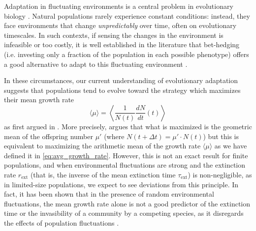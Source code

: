 \documentclass[aps,pre,reprint,10pt,superscriptaddress]{revtex4-2}
\begin{document}
Adaptation in fluctuating environments is a central problem in evolutionary biology \cite{gillespieNaturalSelectionVariances1977,kingscollegeRiskUncertaintyEvolutionary1982,kussellPhenotypicDiversityPopulation2005,ashcroftFixationFinitePopulations2014,patraEmergencePhenotypeSwitching2015,huftonIntrinsicNoiseSystems2016,wienandEvolutionFluctuatingPopulation2017,saakianAlleleFixationProbability2019,taitelbaumPopulationDynamicsChanging2020,camachomateuPhenotypicdependentVariabilityEmergence2021,kaushikTimeFixationChanging2021,collectiveEconomicPrinciplesCell,nakashimaPopulationDynamicsModels2023}. Natural populations rarely experience constant conditions: instead, they face environments that change \emph{unpredictably} over time, often on evolutionary timescales. In such contexts, if sensing the changes in the environment is infeasible or too costly, it is well established in the literature that bet-hedging (i.e. investing only a fraction of the population in each possible phenotype) offers a good alternative to adapt to this fluctuating environment \cite{kussellPhenotypicDiversityPopulation2005,patraEmergencePhenotypeSwitching2015,huftonPhenotypicSwitchingPopulations2018,camachomateuPhenotypicdependentVariabilityEmergence2021,collectiveEconomicPrinciplesCell,nakashimaPopulationDynamicsModels2023}.

In these circumstances, our current understanding of evolutionary adaptation suggests that populations tend to evolve toward the strategy which maximizes their mean growth rate
\begin{equation} \label{eq:avg_growth_rate}
    \langle\mu\rangle=\left\langle\frac{1}{N(t)}\frac{dN}{dt}(t)\right\rangle
\end{equation}
as first argued in \cite{gillespieNaturalSelectionVariances1977}. More precisely, \cite{gillespieNaturalSelectionVariances1977} argues that what is maximized is the geometric mean of the offspring number $\mu'$ (where $N(t+\Delta t)=\mu'\cdot N(t)$) but this is equivalent to maximizing the arithmetic mean of the growth rate $\langle\mu\rangle$ as we have defined it in \cref{eq:avg_growth_rate}. However, this is not an exact result for finite populations, and when environmental fluctuations are strong and the extinction rate $r_\text{ext}$ (that is, the inverse of the mean extinction time $\tau_\text{ext}$) is non-negligible, as in limited-size populations, we expect to see deviations from this principle. In fact, it has been shown that in the presence of random environmental fluctuations, the mean growth rate alone is not a good predictor of the extinction time or the invasibility of a community by a competing species, as it disregards the effects of population fluctuations \cite{pandeMeanGrowthRate2020,pandeQuantifyingInvasibility2022,davila-romeroExtinctionAgentbasedCollective2026}.
\end{document}
